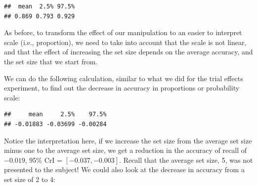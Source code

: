 \documentclass[12pt,]{krantz}
\newenvironment{Shaded}{\begin{snugshade}}{\end{snugshade}}
\newcommand{\DataTypeTok}[1]{\textcolor[rgb]{0.13,0.29,0.53}{#1}}
\newcommand{\DecValTok}[1]{\textcolor[rgb]{0.00,0.00,0.81}{#1}}
\newcommand{\KeywordTok}[1]{\textcolor[rgb]{0.13,0.29,0.53}{\textbf{#1}}}
\newcommand{\NormalTok}[1]{#1}
\newcommand{\OperatorTok}[1]{\textcolor[rgb]{0.81,0.36,0.00}{\textbf{#1}}}
\newcommand{\StringTok}[1]{\textcolor[rgb]{0.31,0.60,0.02}{#1}}
\theoremstyle{definition}
\theoremstyle{definition}
\theoremstyle{definition}
\theoremstyle{remark}
\begin{document}
\begin{verbatim}
##  mean  2.5% 97.5% 
## 0.869 0.793 0.929
\end{verbatim}

As before, to transform the effect of our manipulation to an easier to interpret scale (i.e., proportion), we need to take into account that the scale is not linear, and that the effect of increasing the set size depends on the average accuracy, and the set size that we start from.

We can do the following calculation, similar to what we did for the trial effects experiment, to find out the decrease in accuracy in proportions or probability scale:

\begin{Shaded}
\end{Shaded}

\begin{verbatim}
##     mean     2.5%    97.5% 
## -0.01883 -0.03699 -0.00284
\end{verbatim}

Notice the interpretation here, if we increase the set size from the average set size minus one to the average set size, we get a reduction in the accuracy of recall of \(-0.019\), 95\% CrI = \([ -0.037 , -0.003 ]\). Recall that the average set size, 5, was not presented to the subject! We could also look at the decrease in accuracy from a set size of 2 to 4:

\begin{Shaded}
\end{Shaded}
\end{document}
